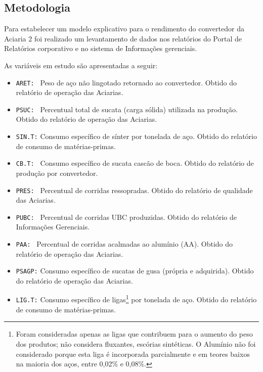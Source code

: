 \begin{multicols}{2}
\section{Metodologia}
	Para estabelecer um modelo explicativo para o rendimento do convertedor da Aciaria 2 foi realizado um levantamento de dados nos relatórios do Portal de Relatórios corporativo\cite{rel13, rel2, rel4, rel16} e no sistema de Informações gerenciais\cite{igsu}.
	
	As variáveis em estudo são apresentadas a seguir:
		\begin{itemize} \itemsep4pt \parskip0pt 
			\item{\texttt{ARET: } Peso de aço não lingotado retornado ao convertedor. Obtido do relatório de operação das Aciarias\cite{rel2}.}
			\item{\texttt{PSUC: } Percentual total de sucata (carga sólida) utilizada na produção. Obtido do relatório de operação das Aciarias\cite{rel2}.}
			\item{\texttt{SIN.T:} Consumo específico de sínter por tonelada de aço. Obtido do relatório de consumo de matérias-primas\cite{rel16}.}
			\item{\texttt{CB.T: } Consumo específico de sucata cascão de boca. Obtido do relatório de produção por convertedor\cite{rel4}.}
			\item{\texttt{PRES: } Percentual de corridas ressopradas. Obtido do relatório de qualidade das Aciarias\cite{rel13}.}
			\item{\texttt{PUBC: } Percentual de corridas UBC produzidas. Obtido do relatório de Informações Gerenciais\cite{igsu}.}
			\item{\texttt{PAA:  } Percentual de corridas acalmadas ao alumínio (AA). Obtido do relatório de operação das Aciarias\cite{rel2}.}
			\item{\texttt{PSAGP:} Consumo específico de sucatas de gusa (própria e adquirida). Obtido do relatório de operação das Aciarias\cite{rel2}.}
			\item{\texttt{LIG.T:} Consumo específico de ligas\footnote{Foram consideradas apenas as ligas que contribuem para o aumento do peso dos produtos; não considera fluxantes, escórias sintéticas. O Alumínio não foi considerado porque esta liga é incorporada parcialmente e em teores baixos na maioria dos aços, entre 0,02\% e 0,08\%.} por tonelada de aço. Obtido do relatório de consumo de matérias-primas\cite{rel16}.}
		\end{itemize}
		

\end{multicols}
